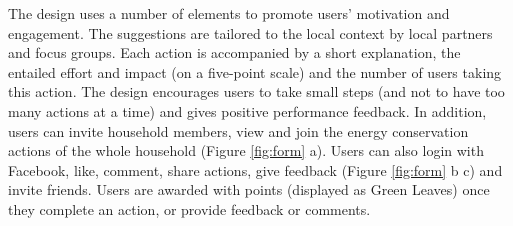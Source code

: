 The design uses a number of elements to promote users' motivation and engagement. 
The suggestions are tailored to the local context by local partners and focus groups. 
Each action is accompanied by a short explanation, the entailed effort and impact (on a five-point scale) and the number of users taking this action. 
The design encourages users to take small steps (and not to have too many actions at a time) and gives positive performance feedback. 
In addition, users can invite household members, %
view and join the energy conservation actions of the whole household (Figure \ref{fig:form} a).
Users can also login with Facebook, like, comment, share actions, %
give feedback (Figure \ref{fig:form} b c) and invite friends. Users are awarded with points  (displayed as Green Leaves) once they complete an action, or provide feedback or comments. 


